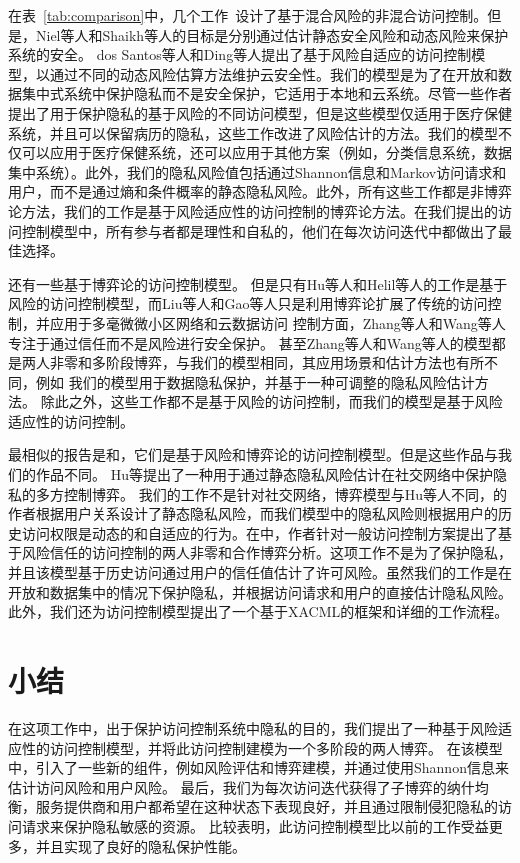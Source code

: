 在表~\ref{tab:comparison}中，几个工作~\cite{ni2010risk,shaikh2012dynamic,santos2016,ding2019,wang2011quantified,zhang2018privacy,zhen2015}设计了基于混合风险的非混合访问控制。但是，Niel等人\cite{ni2010risk}和Shaikh等人\cite{shaikh2012dynamic}的目标是分别通过估计静态安全风险和动态风险来保护系统的安全。 dos Santos等人\cite{santos2016}和Ding等人\cite{ding2019}提出了基于风险自适应的访问控制模型，以通过不同的动态风险估算方法维护云安全性。我们的模型是为了在开放和数据集中式系统中保护隐私而不是安全保护，它适用于本地和云系统。尽管一些作者\cite{wang2011quantified,zhen2015,zhang2018privacy}提出了用于保护隐私的基于风险的不同访问模型，但是这些模型仅适用于医疗保健系统，并且可以保留病历的隐私，这些工作改进了风险估计的方法。我们的模型不仅可以应用于医疗保健系统，还可以应用于其他方案（例如，分类信息系统，数据集中系统）。此外，我们的隐私风险值包括通过Shannon信息和Markov访问请求和用户，而不是通过熵\cite{zhen2015}和条件概率\cite{zhang2018privacy}的静态隐私风险\cite{wang2011quantified}。此外，所有这些工作都是非博弈论方法，我们的工作是基于风险适应性的访问控制的博弈论方法。在我们提出的访问控制模型中，所有参与者都是理性和自私的，他们在每次访问迭代中都做出了最佳选择。


还有一些基于博弈论的访问控制模型\cite{liu2016,gao2018,zhang2015,wang2019,hu2014,helil2017}。 但是只有Hu等人\cite{hu2014}和Helil等人\cite{helil2017}的工作是基于风险的访问控制模型，而Liu等人\cite{liu2016}和Gao等人\cite{gao2018}只是利用博弈论扩展了传统的访问控制，并应用于多毫微微小区网络和云数据访问 控制方面，Zhang等人\cite{zhang2015}和Wang等人\cite{wang2019}专注于通过信任而不是风险进行安全保护。 甚至Zhang等人和Wang等人的模型都是两人非零和多阶段博弈，与我们的模型相同，其应用场景和估计方法也有所不同，例如 我们的模型用于数据隐私保护，并基于一种可调整的隐私风险估计方法。 除此之外，这些工作\cite{liu2016,gao2018,zhang2015,wang2019}都不是基于风险的访问控制，而我们的模型是基于风险适应性的访问控制。

最相似的报告是\cite{hu2014}和\cite{helil2017}，它们是基于风险和博弈论的访问控制模型。但是这些作品与我们的作品不同。 Hu等\cite{hu2014}提出了一种用于通过静态隐私风险估计在社交网络中保护隐私的多方控制博弈。
我们的工作不是针对社交网络，博弈模型与Hu等人\cite{hu2014}不同，\cite{hu2014}的作者根据用户关系设计了静态隐私风险，而我们模型中的隐私风险则根据用户的历史访问权限是动态的和自适应的行为。在\cite{helil2017}中，作者针对一般访问控制方案提出了基于风险信任的访问控制的两人非零和合作博弈分析。这项工作不是为了保护隐私，并且该模型基于历史访问通过用户的信任值估计了许可风险。虽然我们的工作是在开放和数据集中的情况下保护隐私，并根据访问请求和用户的直接估计隐私风险。此外，我们还为访问控制模型提出了一个基于XACML的框架和详细的工作流程。

\section{小结}\label{sec:conclusions}

在这项工作中，出于保护访问控制系统中隐私的目的，我们提出了一种基于风险适应性的访问控制模型，并将此访问控制建模为一个多阶段的两人博弈。 在该模型中，引入了一些新的组件，例如风险评估和博弈建模，并通过使用Shannon信息来估计访问风险和用户风险。 最后，我们为每次访问迭代获得了子博弈的纳什均衡，服务提供商和用户都希望在这种状态下表现良好，并且通过限制侵犯隐私的访问请求来保护隐私敏感的资源。 比较表明，此访问控制模型比以前的工作受益更多，并且实现了良好的隐私保护性能。